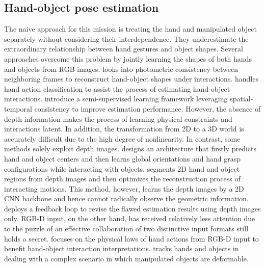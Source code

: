\subsection{Hand-object pose estimation}
The naive approach for this mission is treating the hand \cite{yang2022dynamic, madadi2017end, deng2017hand3d, oberweger2017deepprior++, iqbal2018hand} and manipulated object \cite{wang2019densefusion, schwarz2015rgb, qi2018frustum, zhou2018voxelnet} separately without considering their interdependence. They underestimate the extraordinary relationship between hand gestures and object shapes. Several approaches overcome this problem by jointly learning the shapes of both hands and objects from RGB images.  \cite{hasson2020leveraging} looks into photometric consistency between neighboring frames to reconstruct hand-object shapes under interactions. \cite{tekin2019h+} handles hand action classification to assist the process of estimating hand-object interactions. \cite{liu2021semi} introduce a semi-supervised learning framework leveraging spatial-temporal consistency to improve estimation performance. However, the absence of depth information makes the process of learning physical constraints and interactions latent. In addition, the transformation from 2D to a 3D world is accurately difficult due to the high degree of nonlinearity. In contrast, some methods solely exploit depth images. \cite{choi2017robust} designs an architecture that firstly predicts hand and object centers and then learns global orientations and hand grasp configurations while interacting with objects. \cite{zhang2021single, goudie20173d} segments 2D hand and object regions from depth images and then optimizes the reconstruction process of interacting motions. This method, however, learns the depth images by a 2D CNN backbone and hence cannot radically observe the geometric information. \cite{oberweger2019generalized} deploys a feedback loop to revise the flawed estimation results using depth images only. RGB-D input, on the other hand, has received relatively less attention due to the puzzle of an effective collaboration of two distinctive input formats still holds a secret. \cite{kyriazis2013physically} focuses on the physical laws of hand actions from RGB-D input to benefit hand-object interaction interpretations. \cite{tsoli2018joint} tracks hands and objects in dealing with a complex scenario in which manipulated objects are deformable. 

